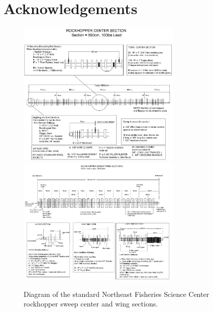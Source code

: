 \documentclass[]{article}
\begin{document}
\hypertarget{acknowledgements}{%
\section*{Acknowledgements}\label{acknowledgements}}

\pagebreak



\hypertarget{refs}{}

\pagebreak

\begin{figure}
\caption{Diagram of the standard Northeast Fisheries Science Center rockhopper sweep center and wing sections.}\label{rockhopper_schematic}
\begin{center}
\includegraphics[width = 0.7\textwidth]{rockhopper_schematic_1.pdf}
\includegraphics[width = 0.7\textwidth]{rockhopper_schematic_2.pdf}
\end{center}
\end{figure}
\end{document}
